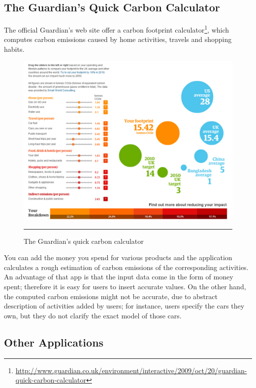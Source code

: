 \subsection{The Guardian's Quick Carbon Calculator}

The official Guardian's web site offer a carbon footprint calculator\footnote{\url{http://www.guardian.co.uk/environment/interactive/2009/oct/20/guardian-quick-carbon-calculator}}, which computes carbon emissions caused by home activities, travels and shopping habits.

\begin{figure}[htbp]
	\centering
		\includegraphics[scale=0.35]{./Figures/chapter2/figure22.pdf}
		\rule{35em}{0.5pt}
	\caption[The Guardian's quick carbon calculator]{The Guardian's quick carbon calculator}
	\label{fig:guardiansCarbonCalculator}
\end{figure}

You can add the money you spend for various products and the application calculates a rough estimation of carbon emissions of the corresponding activities. An advantage of that app is that the input data come in the form of money spent; therefore it is easy for users to insert accurate values. On the other hand, the computed carbon emissions might not be accurate, due to abstract description of activities added by users; for instance, users specify the cars they own, but they do not clarify the exact model of those cars.

\subsection{Other Applications}

